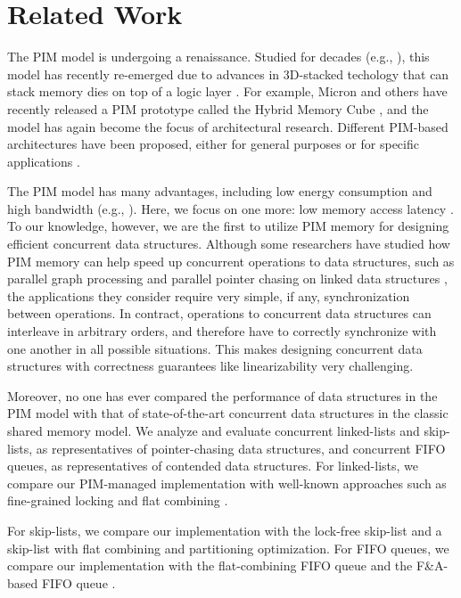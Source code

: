 \section{Related Work}
\label{section:related_work}
The PIM model is undergoing a renaissance. 
Studied for decades 
(e.g., \cite{Stone1970, Kogge1994, Gokhale1995, Patterson1997, Oskin1998, KangHYKGLTP99, Hall1999}), 
this model has recently re-emerged due to advances in 3D-stacked techology that 
can stack memory dies on top of a logic layer \cite{jeddeloh2012, Loh2008, Black2006}. 
For example, Micron and others have recently released a PIM prototype called 
the Hybrid Memory Cube \cite{website:HMC}, and the model has again become the focus of architectural research.
Different PIM-based architectures have been proposed, either for general purposes or for 
specific applications \cite{Ahn2015:1, Ahn2015:2, Zhang2014:TTP, hsieh2016accelerating,
Azarkhish16, Akin2015:DRM, Azarkhish2015, AzarkhishPRLB17, boroumand2016, ZhuASSHPF13, ZhuGSPF13}.

The PIM model has many advantages, including low energy consumption and high bandwidth 
(e.g., \cite{Ahn2015:2, Zhang2014:TTP, ZhuASSHPF13, AzarkhishPRLB17}). 
Here, we focus on one more: low memory access latency 
\cite{Loh2008, hsieh2016accelerating, Azarkhish16}.
To our knowledge, however, we are the first to utilize PIM memory for designing efficient 
concurrent data structures. 
Although some researchers have studied how PIM memory can help speed up concurrent 
operations to data structures, such as parallel graph processing \cite{Ahn2015:2} and  
parallel pointer chasing on linked data structures \cite{hsieh2016accelerating}, 
the applications they consider require very simple, if any, synchronization between operations. 
In contract, operations to concurrent data structures can interleave in arbitrary orders, 
and therefore have to correctly synchronize with one another in all possible situations. 
This makes designing concurrent data structures with correctness guarantees like 
linearizability \cite{Herlihy90} very challenging. 

Moreover, no one has ever compared the performance of data structures in the PIM model 
with that of state-of-the-art concurrent data structures in the classic shared memory model. 
We analyze and evaluate concurrent linked-lists and skip-lists, 
as representatives of pointer-chasing data structures, and concurrent FIFO queues, 
as representatives of contended data structures.
For linked-lists, we compare our PIM-managed implementation with well-known approaches 
such as fine-grained locking \cite{Heller05} and flat combining \cite{Hendler10, Fatourou12}.

For skip-lists, we compare our implementation with the lock-free skip-list \cite{Herlihy08} 
and a skip-list with flat combining and partitioning optimization. 
For FIFO queues, we compare our implementation with the flat-combining FIFO queue 
\cite{Hendler10} and the F\&A-based FIFO queue \cite{Morrison13}. 